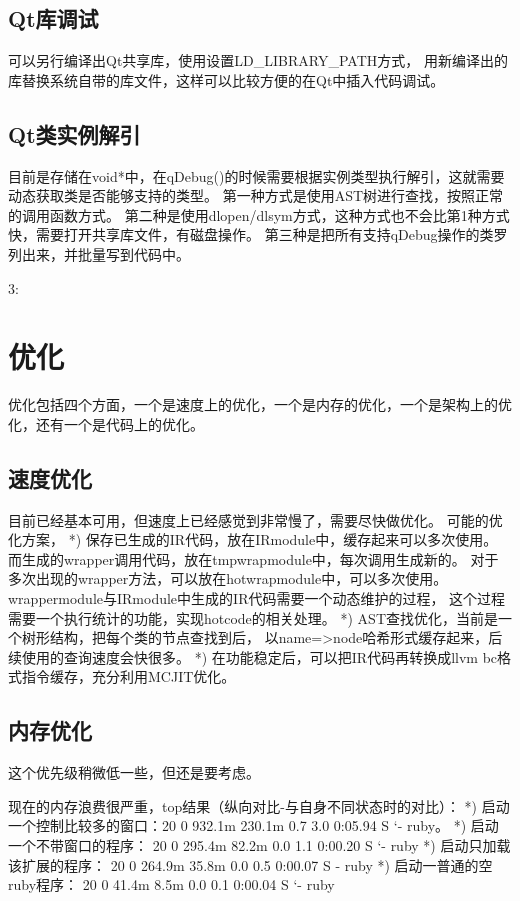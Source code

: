 \section{Qt库调试}
可以另行编译出Qt共享库，使用设置LD\_LIBRARY\_PATH方式，
用新编译出的库替换系统自带的库文件，这样可以比较方便的在Qt中插入代码调试。

\section{Qt类实例解引}
目前是存储在void*中，在qDebug()的时候需要根据实例类型执行解引，这就需要动态获取类是否能够支持的类型。
第一种方式是使用AST树进行查找，按照正常的调用函数方式。
第二种是使用dlopen/dlsym方式，这种方式也不会比第1种方式快，需要打开共享库文件，有磁盘操作。
第三种是把所有支持qDebug操作的类罗列出来，并批量写到代码中。

3:

\chapter{优化}
优化包括四个方面，一个是速度上的优化，一个是内存的优化，一个是架构上的优化，还有一个是代码上的优化。
\section{速度优化}
目前已经基本可用，但速度上已经感觉到非常慢了，需要尽快做优化。
可能的优化方案，
*) 保存已生成的IR代码，放在IRmodule中，缓存起来可以多次使用。
而生成的wrapper调用代码，放在tmpwrapmodule中，每次调用生成新的。
对于多次出现的wrapper方法，可以放在hotwrapmodule中，可以多次使用。
wrappermodule与IRmodule中生成的IR代码需要一个动态维护的过程，
这个过程需要一个执行统计的功能，实现hotcode的相关处理。
*) AST查找优化，当前是一个树形结构，把每个类的节点查找到后，
以name=>node哈希形式缓存起来，后续使用的查询速度会快很多。
*) 在功能稳定后，可以把IR代码再转换成llvm bc格式指令缓存，充分利用MCJIT优化。


\section{内存优化}
这个优先级稍微低一些，但还是要考虑。

现在的内存浪费很严重，top结果（纵向对比-与自身不同状态时的对比）：
*) 启动一个控制比较多的窗口：20   0  932.1m 230.1m   0.7  3.0   0:05.94 S   `- ruby。
*) 启动一个不带窗口的程序： 20   0  295.4m  82.2m   0.0  1.1   0:00.20 S    `- ruby
*) 启动只加载该扩展的程序： 20   0  264.9m  35.8m   0.0  0.5   0:00.07 S    - ruby
*) 启动一普通的空ruby程序： 20   0   41.4m   8.5m   0.0  0.1   0:00.04 S   `- ruby

